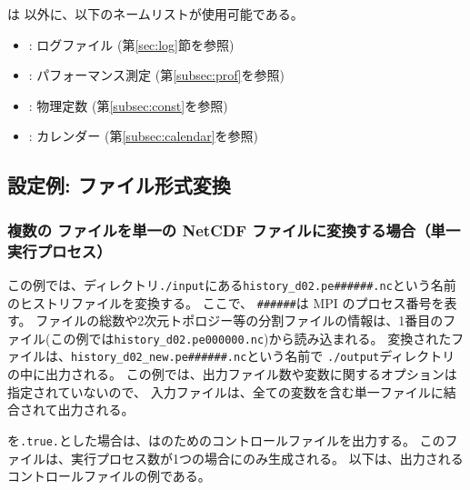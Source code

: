 \sno は 以外に、以下のネームリストが使用可能である。

\begin{itemize}
 \item {}: ログファイル (第\ref{sec:log}節を参照)
 \item {}: パフォーマンス測定 (第\ref{subsec:prof}を参照)
 \item {}: 物理定数 (第\ref{subsec:const}を参照)
 \item {}: カレンダー (第\ref{subsec:calendar}を参照)
\end{itemize}



\subsection{設定例: ファイル形式変換}

\subsubsection{複数の \scalenetcdf ファイルを単一の NetCDF ファイルに変換する場合（単一実行プロセス）}
%
%
この例では、ディレクトリ\verb|./input|にある\verb|history_d02.pe######.nc|という名前のヒストリファイルを変換する。
ここで、 \verb|######|は MPI のプロセス番号を表す。
ファイルの総数や2次元トポロジー等の分割ファイルの情報は、1番目のファイル(この例では\verb|history_d02.pe000000.nc|)から読み込まれる。
変換されたファイルは、\verb|history_d02_new.pe######.nc|という名前で \verb|./output|ディレクトリの中に出力される。
この例では、出力ファイル数や変数に関するオプションは指定されていないので、
入力ファイルは、全ての変数を含む単一ファイルに結合されて出力される。

を\verb|.true.|とした場合は、\sno は{\grads}のためのコントロールファイルを出力する。
このファイルは、実行プロセス数が1つの場合にのみ生成される。
以下は、出力されるコントロールファイルの例である。

